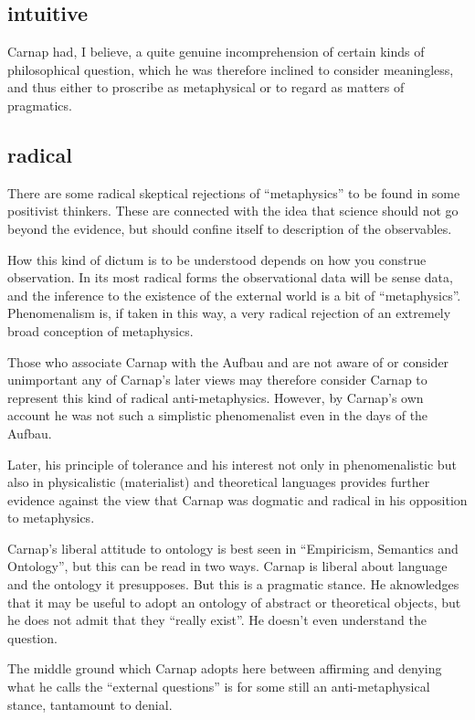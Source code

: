\documentclass[10pt,titlepage]{book}
\begin{document}
\subsection{intuitive}
Carnap had, I believe, a quite genuine incomprehension of certain kinds of philosophical question, which he was therefore inclined to consider meaningless, and thus either to proscribe as metaphysical or to regard as matters of pragmatics.

\subsection{radical}
There are some radical skeptical rejections of ``metaphysics'' to be found in some positivist thinkers.
These are connected with the idea that science should not go beyond the evidence, but should confine itself to description of the observables.

How this kind of dictum is to be understood depends on how you construe observation.
In its most radical forms the observational data will be sense data, and the inference to the existence of the external world is a bit of ``metaphysics''.
Phenomenalism is, if taken in this way, a very radical rejection of an extremely broad conception of metaphysics.

Those who associate Carnap with the Aufbau and are not aware of or consider unimportant any of Carnap's later views may therefore consider Carnap to represent this kind of radical anti-metaphysics.
However, by Carnap's own account he was not such a simplistic phenomenalist even in the days of the Aufbau.

Later, his principle of tolerance and his interest not only in phenomenalistic but also in physicalistic (materialist) and theoretical languages provides further evidence against the view that Carnap was dogmatic and radical in his opposition to metaphysics.

Carnap's liberal attitude to ontology is best seen in ``Empiricism, Semantics and Ontology'', but this can be read in two ways.
Carnap is liberal about language and the ontology it presupposes.
But this is a pragmatic stance.
He aknowledges that it may be useful to adopt an ontology of abstract or theoretical objects, but he does not admit that they ``really exist''.
He doesn't even understand the question.

The middle ground which Carnap adopts here between affirming and denying what he calls the ``external questions'' is for some still an anti-metaphysical stance, tantamount to denial.
\end{document}
